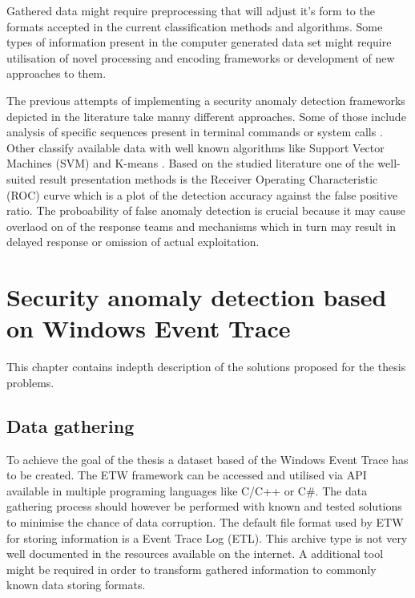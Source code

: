 \documentclass[a4paper,twoside,12pt]{book}
\begin{document}
Gathered data might require preprocessing that will adjust it's form to the formats accepted in the
current classification methods and algorithms. Some types of information present in the computer 
generated data set might require utilisation of novel processing and encoding frameworks or 
development of new approaches to them.  



The previous attempts of implementing a security anomaly detection frameworks depicted in the 
literature take manny different approaches. Some of those include analysis of specific sequences
present in terminal commands \cite{bib:lane1997application} or system calls \cite{bib:forest}. 
Other classify available data with well known algorithms like Support Vector Machines (SVM) and K-means 
\cite{bib:rsvm}. %
Based on the studied literature one of the well-suited result presentation methods is the Receiver 
Operating Characteristic (ROC) curve which is a plot of the detection accuracy against the false 
positive ratio. The proboability of false anomaly detection is crucial because it may cause overlaod
on of the response teams and mechanisms which in turn may result in delayed response or omission
of actual exploitation. 



\chapter{Security anomaly detection based on Windows Event Trace}

This chapter contains indepth description of the solutions proposed for the thesis problems. 

\section{Data gathering}
To achieve the goal of the thesis a dataset based of the Windows Event Trace has to 
be created. The ETW framework can be accessed and utilised via API available in multiple
programing languages like C/C++\cite{bib:etwcpp} or C\#\cite{bib:etwcsharp}. The 
data gathering process should however be performed with known and tested solutions to
minimise the chance of data corruption. The default file format used by ETW for storing 
information is a Event Trace Log (ETL). This archive type is not very well documented in 
the resources available on the internet. A additional tool might be required in order to 
transform gathered information to commonly known data storing formats.
\end{document}
